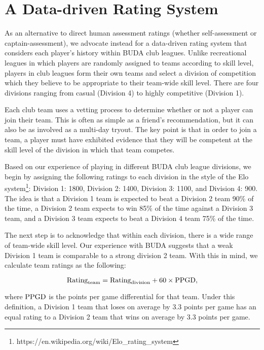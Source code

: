 \section{A Data-driven Rating System}\label{sec:club_rating}

As an alternative to direct human assessment ratings (whether self-assessment or captain-assessment), we advocate instead for a data-driven rating system that considers each player's history within BUDA club leagues. Unlike recreational leagues in which players are randomly assigned to teams according to skill level, players in club leagues form their own teams and select a division of competition which they believe to be appropriate to their team-wide skill level.  There are four divisions ranging from casual (Division 4) to highly competitive (Division 1).

Each club team uses a vetting process to determine whether or not a player can join their team. This is often as simple as a friend's recommendation, but it can also be as involved as a multi-day tryout. The key point is that in order to join a team, a player must have exhibited evidence that they will be competent at the skill level of the division in which that team competes.

Based on our experience of playing in different BUDA club league divisions, we begin by assigning the following ratings to each division in the style of the Elo system\footnote{https://en.wikipedia.org/wiki/Elo_rating_system}: Division 1: 1800, Division 2: 1400, Division 3: 1100, and Division 4: 900.  The idea is that a Division 1 team is expected to beat a Division 2 team 90\% of the time, a Division 2 team expects to win 85\% of the time against a Division 3 team, and a Division 3 team expects to beat a Division 4 team 75\% of the time.

The next step is to acknowledge that within each division, there is a wide range of team-wide skill level. Our experience with BUDA suggests that a weak Division 1 team is comparable to a strong division 2 team.  With this in mind, we calculate team ratings as the following:

\begin{equation}
{\rm Rating}_{\rm team} = {\rm Rating}_{\rm division} + 60 \times {\rm PPGD},
\end{equation}

\noindent where ${\rm PPGD}$ is the points per game differential for that team. Under this definition, a Division 1 team that loses on average by 3.3 points per game has an equal rating to a Division 2 team that wins on average by 3.3 points per game.

